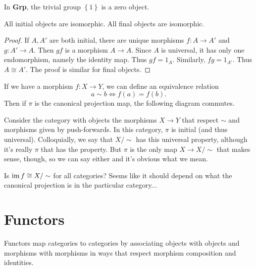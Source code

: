 \documentclass[10pt]{report}
\begin{document}
\begin{ex}[]
In \textbf{Grp}, the trivial group $\left\{ 1 \right\}$ is a zero object.
\end{ex}

\begin{prop}
	All initial objects are isomorphic. All final objects are isomorphic.
\end{prop}
\begin{proof}
	If $A,A'$ are both initial, there are unique morphisms $f:A\to A'$ and $g:A'\to A$. Then $gf$ is a morphism $A\to A$. Since $A$ is universal, it has only one endomorphism, namely the identity map. Thus $gf=1_{A}$. Similarly, $fg=1_{A'}$. Thus $A \cong A'$. The proof is similar for final objects.
\end{proof}

\begin{ex}[]
If we have a morphism $f:X\to Y$, we can define an equivalence relation
\[
	a \sim b \iff f(a) = f(b).
\] Then if $\pi$ is the canonical projection map, the following diagram commutes.
\begin{figure}[H]
	\centering
{}
\end{figure}

Consider the category with objects the morphisms $X\to Y$ that respect $\sim$ and morphisms given by push-forwards. In this category, $\pi$ is initial (and thus universal). Colloquially, we say that $X/\sim$ has this universal property, although it's really $\pi$ that has the property. But $\pi$ is the only map $X \to  X/\sim$ that makes sense, though, so we can say either and it's obvious what we mean.

{\color{red}Is $\operatorname{im} f \cong X/\sim$ for all categories? Seems like it should depend on what the canonical projection is in the particular category...}
\end{ex}


\section{Functors}

Functors map categories to categories by associating objects with objects and morphisms with morphisms in ways that respect morphism composition and identities.
\end{document}
